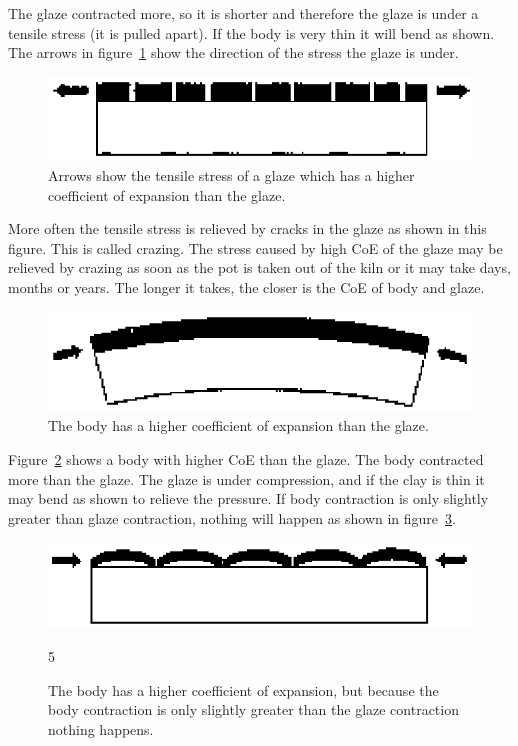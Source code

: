 The glaze contracted more, so it is shorter and therefore the glaze is under a 
tensile stress (it is pulled apart). If the body is very thin it will bend as 
shown. The arrows in figure~\ref{fig:coearrow} show the direction of the stress 
the glaze is under.
\begin{figure}[htbp!]
  \centering
  \includegraphics[width=0.6\linewidth]{img/coearrow.eps}
  \caption{Arrows show the tensile stress of a glaze which has a higher 
  coefficient of expansion than the glaze.}
  \label{fig:coearrow}
\end{figure}
More often the tensile stress is relieved by cracks in the glaze as shown in 
this figure. This is called crazing. The stress caused by high CoE of the glaze 
may be relieved by crazing as soon as the pot is taken out of the kiln or it 
may take days, months or years. The longer it takes, the closer is the CoE of 
body and glaze.
\begin{figure}[htbp!]
  \centering
  \includegraphics[width=0.6\linewidth]{img/coebody.eps}
  \caption{The body has a higher coefficient of expansion than the glaze.}
  \label{fig:coebody}
\end{figure}
Figure~\ref{fig:coebody} shows a body with higher CoE than the glaze. The body 
contracted more than the glaze. The glaze is under compression, and if the clay 
is thin it may bend as shown to relieve the pressure. If body contraction is 
only slightly greater than glaze contraction, nothing will happen as shown in 
figure~\ref{fig:coebodynothing}.
\begin{figure}[htbp!]
  \centering
  \includegraphics[width=0.6\linewidth]{img/coebodynothing.eps}
  \caption{The body has a higher coefficient of expansion, but because the body 
  contraction is only slightly greater than the glaze contraction nothing 
  happens.}
  \label{fig:coebodynothing}
5\end{figure}

